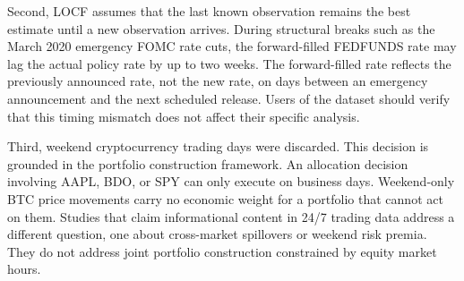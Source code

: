 Second, LOCF assumes that the last known observation remains the best estimate until a new observation arrives. During structural breaks such as the March 2020 emergency FOMC rate cuts, the forward-filled FEDFUNDS rate may lag the actual policy rate by up to two weeks. The forward-filled rate reflects the previously announced rate, not the new rate, on days between an emergency announcement and the next scheduled release. Users of the dataset should verify that this timing mismatch does not affect their specific analysis.

Third, weekend cryptocurrency trading days were discarded. This decision is grounded in the portfolio construction framework. An allocation decision involving AAPL, BDO, or SPY can only execute on business days. Weekend-only BTC price movements carry no economic weight for a portfolio that cannot act on them. Studies that claim informational content in 24/7 trading data address a different question, one about cross-market spillovers or weekend risk premia. They do not address joint portfolio construction constrained by equity market hours.

